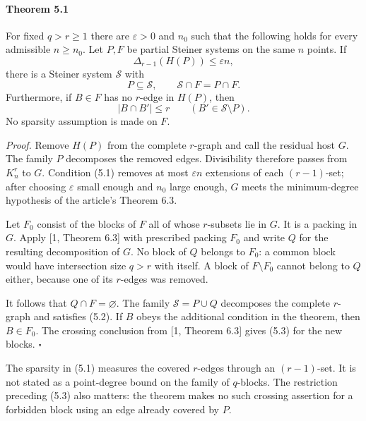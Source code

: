 \documentclass[english,11pt,a4paper]{article}
\begin{document}
\par
\begin{samepage}
\paragraph{Theorem 5.1}\label{theorem-5.1}

For fixed \(q>r\ge1\) there are \(\varepsilon>0\) and \(n_0\) such that the following holds for every admissible \(n\ge n_0\). Let \(P,F\) be partial Steiner systems on the same \(n\) points. If \[\Delta_{r-1}(H(P))\le\varepsilon n,
\tag{5.1}\] there is a Steiner system \(\mathcal S\) with \[P\subseteq\mathcal S,\qquad
\mathcal S\cap F=P\cap F.
\tag{5.2}\] Furthermore, if \(B\in F\) has no \(r\)-edge in \(H(P)\), then \[|B\cap B'|\le r
\qquad(B'\in\mathcal S\setminus P).
\tag{5.3}\] No sparsity assumption is made on \(F\).

\end{samepage}
\emph{Proof.} Remove \(H(P)\) from the complete \(r\)-graph and call the residual host \(G\). The family \(P\) decomposes the removed edges. Divisibility therefore passes from \(K_n^r\) to \(G\). Condition (5.1) removes at most \(\varepsilon n\) extensions of each \((r-1)\)-set; after choosing \(\varepsilon\) small enough and \(n_0\) large enough, \(G\) meets the minimum-degree hypothesis of the article's Theorem 6.3.

Let \(F_0\) consist of the blocks of \(F\) all of whose \(r\)-subsets lie in \(G\). It is a packing in \(G\). Apply {[}1, Theorem 6.3{]} with prescribed packing \(F_0\) and write \(Q\) for the resulting decomposition of \(G\). No block of \(Q\) belongs to \(F_0\): a common block would have intersection size \(q>r\) with itself. A block of \(F\setminus F_0\) cannot belong to \(Q\) either, because one of its \(r\)-edges was removed.

It follows that \(Q\cap F=\varnothing\). The family \(\mathcal S=P\cup Q\) decomposes the complete \(r\)-graph and satisfies (5.2). If \(B\) obeys the additional condition in the theorem, then \(B\in F_0\). The crossing conclusion from {[}1, Theorem 6.3{]} gives (5.3) for the new blocks. \(\square\)

The sparsity in (5.1) measures the covered \(r\)-edges through an \((r-1)\)-set. It is not stated as a point-degree bound on the family of \(q\)-blocks. The restriction preceding (5.3) also matters: the theorem makes no such crossing assertion for a forbidden block using an edge already covered by \(P\).
\end{document}
